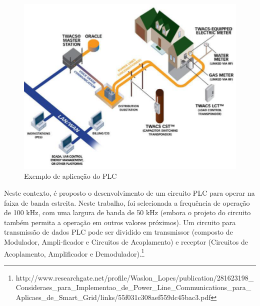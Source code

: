 \begin{figure}[H]
  \begin{center}
	\includegraphics[keepaspectratio]{figuras/exemplo_plc.eps}
	\caption{Exemplo de aplicação do PLC}
  \end{center}
\end{figure}

	Neste contexto, é proposto o desenvolvimento de um circuito PLC para operar na faixa de banda estreita. Neste trabalho, foi selecionada a frequência de operação de 100 kHz, com uma largura de banda de 50 kHz (embora o projeto do circuito também permita a operação em outros valores próximos). Um circuito para transmissão de dados PLC pode ser dividido em transmissor (composto de Modulador, Ampli-ficador e Circuitos de Acoplamento) e receptor (Circuitos de Acoplamento, Amplificador e Demodulador).\footnote{http://www.researchgate.net/profile/Waslon\_Lopes/publication/281623198\_Consideraes\_para\_Implementao\_de\_Power\_Line\_Communications\_para\_Aplicaes\_de\_Smart\_Grid/links/55f031c308aef559dc45bac3.pdf}
	
